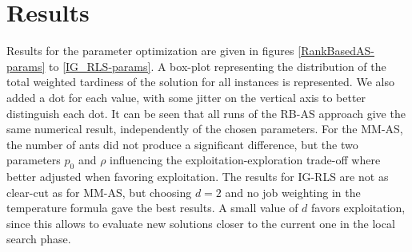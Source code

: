 \documentclass[runningheads]{llncs}
\begin{document}
\section{Results}
\label{sec:res}

Results for the parameter optimization are given in figures
\ref{RankBasedAS-params} to \ref{IG_RLS-params}. A box-plot representing the
distribution of the total weighted tardiness of the solution for all instances
is represented. We also added a dot for each value, with some jitter on the
vertical axis to better distinguish each dot. It can be seen that all runs of
the RB-AS approach give the same numerical result, independently of the chosen
parameters. For the MM-AS, the number of ants did not produce a significant
difference, but the two parameters $p_0$ and $\rho$ influencing the
exploitation-exploration trade-off where better adjusted when favoring
exploitation. The results for IG-RLS are not as clear-cut as for MM-AS, but
choosing $d=2$ and no job weighting in the temperature formula gave the best
results. A small value of $d$ favors exploitation, since this allows to evaluate
new solutions closer to the current one in the local search phase.

\begin{figure}
\end{figure}
\end{document}
